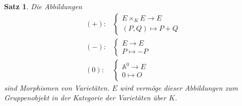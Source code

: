\documentclass{amsart}
\theoremstyle{plain}
\newtheorem{proposition}[subsection]{Satz}
\theoremstyle{definition}
\newcommand{\affinespace}{\mathds{A}}
\begin{document}
\begin{proposition}
	Die Abbildungen
	\begin{align*}
		\operatorname{(+)} \colon &
		\begin{cases}
			E \times_K E \rightarrow E \\
			(P, Q) \mapsto P + Q
		\end{cases} \\
		\operatorname{(-)} \colon &
		\begin{cases}
			E \rightarrow E \\
			P \mapsto -P
		\end{cases} \\
		\operatorname{(0)} \colon &
		\begin{cases}
			\affinespace^0 \rightarrow E \\
			0 \mapsto O
		\end{cases}
	\end{align*}
	sind Morphismen von Varietäten.
	$E$ wird vermöge dieser Abbildungen zum Gruppenobjekt in der Kategorie der Varietäten über $K$.
\end{proposition}
\end{document}
